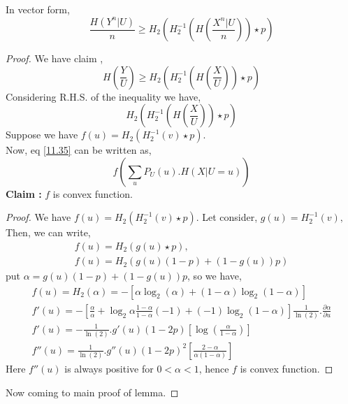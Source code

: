 \documentclass{article}
\begin{document}
In vector form,
\begin{equation}
	\frac{H\left( Y^{n}|U \right)}{n} \geq H_2\left( H_{2}^{-1}\left( H\left(\frac{ X^{n}|U}{n}\right)\right) \star p\right)
\end{equation}

\begin{proof}
We have claim ,
\begin{equation}
	H\left(\frac{Y}{U}\right) \geq H_2\left( H_{2}^{-1}\left( H\left( \frac{X}{U}\right)\right) \star p\right)
\end{equation}
Considering R.H.S. of the inequality we have, 
\begin{equation}
 H_2\left( H_{2}^{-1}\left( H\left( \frac{X}{U}\right)\right) \star p\right) \label{11.35}
\end{equation}
Suppose we have $f(u) = H_{2} \left( H_{2}^{-1}(v)\star p\right)$.\\
Now, eq \eqref{11.35} can be written as, 
\begin{equation}	
f \left( \sum_{u} P_{U}(u). H \left( X | U = u\right)\right)
\end{equation}
 \textbf{Claim :} $f$ is convex function. 
 \begin{proof}
 	We have $f(u) = H_{2} \left( H_{2}^{-1}(v)\star p\right)$.
 Let consider, $ g(u) = H_{2}^{-1}(v),$\\ 
 Then, we can write,
 \begin{eqnarray*}
 f(u) = H_{2} \left(g(u)\star p\right),\\
 f(u) = H_{2} \left( g(u)(1-p) + \left(1-g(u)\right)p\right)	
 \end{eqnarray*}
put $\alpha = g(u)(1-p) + \left(1-g(u)\right)p $, so we have,
 \begin{eqnarray*}
	f(u) = H_{2} \left( \alpha \right)= - \left[ \alpha \log_{2}(\alpha) + (1-\alpha) \log_{2}(1-\alpha)\right]	\\
	f'(u) = - \left[ \frac{\alpha}{\alpha} + \log_{2}\alpha \frac{1-\alpha}{ 1-\alpha} (-1) + (-1) \log_{2}(1-\alpha)\right] \frac{1}{\ln(2)}. \frac{\partial \alpha }{\partial u}  \\
	f'(u) = - \frac{1}{\ln(2)}.g'(u)(1-2p) \left[ \log (\frac{\alpha}{1- \alpha})\right]\\
	f''(u) = \frac{1}{\ln(2)}.g''(u)(1-2p)^2 \left[  \frac{2- \alpha}{\alpha (1 -\alpha)}\right]
\end{eqnarray*}	
 Here $f''(u)$ is always positive for $0< \alpha <1$, hence $f$ is convex function.		
 	\end{proof}
 Now coming to main proof of lemma.

\end{proof}
\end{document}
